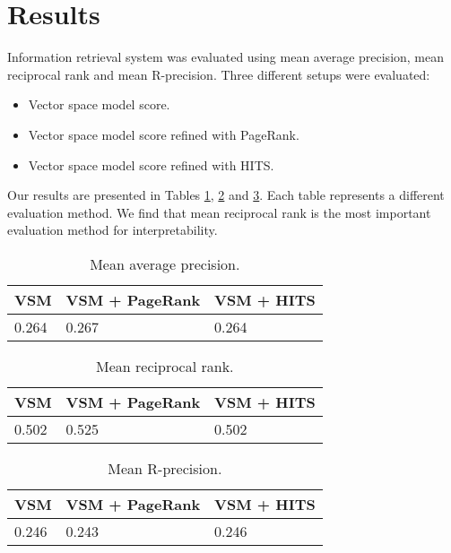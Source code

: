 \documentclass[10pt, a4paper]{article}
\begin{document}
\section{Results}
Information retrieval system was evaluated using mean average precision, mean reciprocal rank and mean R-precision. Three different setups were evaluated:
\begin{itemize}
\item Vector space model score.
\item Vector space model score refined with PageRank.
\item Vector space model score refined with HITS.
\end{itemize}

Our results are presented in Tables \ref{tab:MAP}, \ref{tab:MRR} and \ref{tab:MR}. Each table represents a different evaluation method. We find that mean reciprocal rank is the most important evaluation method for interpretability.

\begin{table}
\caption{Mean average precision.}
\label{tab:MAP}
\begin{center}
\begin{tabular}{lll}
\toprule
VSM & VSM + PageRank & VSM + HITS \\
\midrule
0.264 & 0.267 & 0.264\\
\bottomrule
\end{tabular}
\end{center}
\end{table}

\begin{table}
\caption{Mean reciprocal rank.}
\label{tab:MRR}
\begin{center}
\begin{tabular}{lll}
\toprule
VSM & VSM + PageRank & VSM + HITS \\
\midrule
0.502 & 0.525 & 0.502\\
\bottomrule
\end{tabular}
\end{center}
\end{table}

\begin{table}
\caption{Mean R-precision.}
\label{tab:MR}
\begin{center}
\begin{tabular}{lll}
\toprule
VSM & VSM + PageRank & VSM + HITS \\
\midrule
0.246 & 0.243 & 0.246\\
\bottomrule
\end{tabular}
\end{center}
\end{table}
\end{document}
